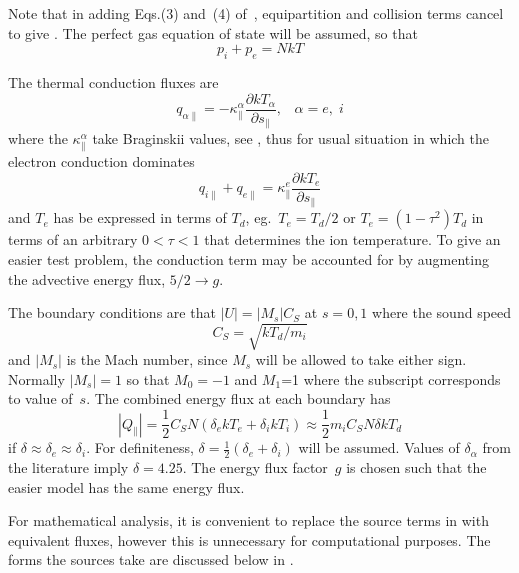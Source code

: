Note that in adding Eqs.(3) and~(4) of~\cite{Ha13Benc}, equipartition and collision terms cancel 
to give . The perfect gas equation of state will be assumed, so that
\begin{equation}\label{eq:sysp}
p_i+p_e=N k T
\end{equation}

The thermal conduction fluxes are
\begin{equation}\label{eq:qei}
q_{\alpha\|}= -\kappa^\alpha_{\|} \frac{\partial k T_\alpha}{\partial s_{\|}},\;\;\;\alpha=e,\;i
\end{equation}
where the $\kappa^\alpha_{\|}$ take Braginskii values, see , thus for usual situation
in which the electron conduction dominates
\begin{equation}\label{eq:qeisum}
q_{i\|} + q_{e\|}= \kappa^e_{\|} \frac{\partial k T_e}{\partial s_{\|}}
\end{equation}
and  $T_e$ has be expressed in terms of $T_d$, eg.\ $T_e=T_d/2$ or $T_e=(1-\tau^2)T_d$
in terms of an arbitrary $0<\tau<1$ that determines the ion temperature. To give an easier test
problem, the conduction term may be accounted for by augmenting the advective energy flux, $5/2\rightarrow g$.

The boundary conditions are that $|U|=|M_s| C_S$ at $s=0,1$ where the sound speed
\begin{equation}
C_S= \sqrt{k T_d/m_i}
\end{equation}
and $|M_s|$ is the Mach number, since $M_s$ will be allowed to take either sign. Normally $|M_s|=1$
so that $M_0=-1$ and $M_1$=1 where the subscript corresponds to value of~$s$.
The combined energy flux at each boundary has
\begin{equation}
|Q_{\|}|=\frac{1}{2}C_S N (\delta_e k T_e + \delta_i k T_i) \approx \frac{1}{2}
m_i C_S N \delta k T_d
\end{equation}
if $\delta \approx \delta_e \approx \delta_i$. For definiteness, $\delta=\frac{1}{2}(\delta_e+\delta_i)$
will be assumed. Values of $\delta_\alpha$ from the literature imply $\delta=4.25$.
The energy flux factor~$g$ is chosen such that the easier model has the same energy flux.

For mathematical analysis, it is convenient to replace the source terms in 
with equivalent fluxes, however this is unnecessary for computational purposes.
The forms the sources take are discussed below in . 

